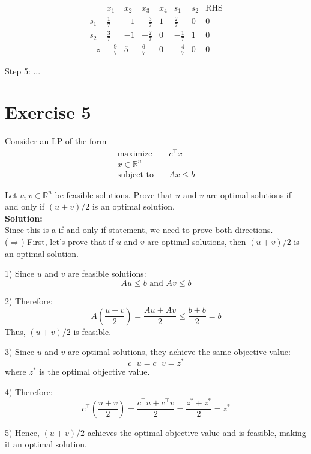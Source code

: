 \documentclass{article}
\begin{document}
\[
\begin{array}{c|cccccc|c}
  & x_1 & x_2 & x_3 & x_4 & s_1 & s_2 & \text{RHS}\\\hline
s_1 & \tfrac17 & -1 & -\tfrac37 & 1 & \tfrac27 & 0 & 0\\
s_2 & \tfrac37 & -1 & -\tfrac27 & 0 & -\tfrac17 & 1 & 0\\\hline
-z   & -\tfrac97       & 5         & \tfrac{6}{7}         & 0        & -\tfrac{4}{7} & 0 & 0
\end{array}
\]

Step 5: ...

\newpage

\section*{Exercise 5}
Consider an LP of the form
\begin{align*}
\text{maximize} \quad & c^\top x \\
x \in \mathbb{R}^n \\
\text{subject to} \quad & Ax \leq b
\end{align*}

Let $u, v \in \mathbb{R}^n$ be feasible solutions. Prove that $u$ and $v$ are optimal solutions if and only if $(u + v)/2$ is an optimal solution. \\

\textbf{Solution: } \\

Since this is a if and only if statement, we need to prove both directions. \\

($\Rightarrow$) First, let's prove that if $u$ and $v$ are optimal solutions, then $(u + v)/2$ is an optimal solution.

1) Since $u$ and $v$ are feasible solutions:
   \[ Au \leq b \text{ and } Av \leq b \]

2) Therefore:
   \[ A(\frac{u + v}{2}) = \frac{Au + Av}{2} \leq \frac{b + b}{2} = b \]
   Thus, $(u + v)/2$ is feasible.

3) Since $u$ and $v$ are optimal solutions, they achieve the same objective value:
   \[ c^\top u = c^\top v = z^* \]
   where $z^*$ is the optimal objective value.

4) Therefore:
   \[ c^\top(\frac{u + v}{2}) = \frac{c^\top u + c^\top v}{2} = \frac{z^* + z^*}{2} = z^* \]

5) Hence, $(u + v)/2$ achieves the optimal objective value and is feasible, making it an optimal solution. \\
\end{document}
